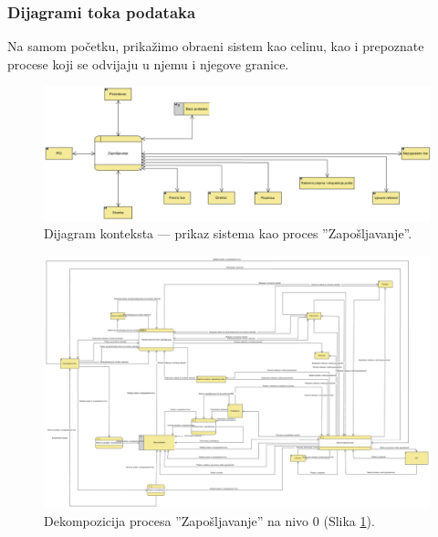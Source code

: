 \begin{mylandscape}
	\subsubsection{Dijagrami toka podataka}
	
	Na samom po\v cetku, prika\v zimo obra\dj eni sistem kao celinu, kao i prepoznate procese koji se odvijaju u njemu i njegove granice.
	
	\begin{figure}[H]
		\centering
		\includegraphics[width=0.8\paperwidth]{dijagrami/dijagrami-toka-podataka/zaposljavanje-dijagram-konteksta.png}
		\caption{Dijagram konteksta — prikaz sistema kao proces ''Zapo\v sljavanje''.}
		\label{dtp: dijagram konteksta}
	\end{figure}
	
	\newpage
	
	\begin{figure}[H]
		\centering
		\includegraphics[width=0.7\paperwidth]{dijagrami/dijagrami-toka-podataka/zaposljavanje-dtp-nivoa-0.png}
		\caption{Dekompozicija procesa ''Zapo\v sljavanje'' na nivo 0 (Slika \ref{dtp: dijagram konteksta}).}
	\end{figure}
	
\end{mylandscape}